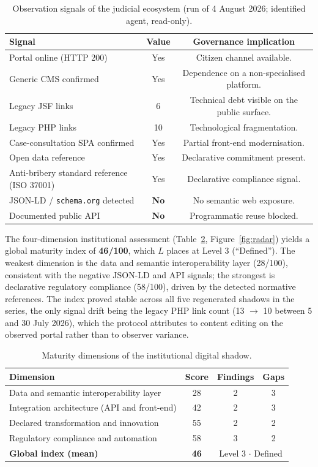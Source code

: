 \documentclass[engproc,article,submit,moreauthors]{Definitions/mdpi}
\begin{document}
\begin{table}[H]
\small
\caption{Observation signals of the judicial ecosystem (run of 4 August 2026; identified agent, read-only).\label{tab:signals}}
\begin{tabularx}{\textwidth}{Xcc}
\toprule
\textbf{Signal} & \textbf{Value} & \textbf{Governance implication}\\
\midrule
Portal online (HTTP 200) & Yes & Citizen channel available.\\
Generic CMS confirmed & Yes & Dependence on a non-specialised platform.\\
Legacy JSF links & 6 & Technical debt visible on the public surface.\\
Legacy PHP links & 10 & Technological fragmentation.\\
Case-consultation SPA confirmed & Yes & Partial front-end modernisation.\\
Open data reference & Yes & Declarative commitment present.\\
Anti-bribery standard reference (ISO 37001) & Yes & Declarative compliance signal.\\
JSON-LD / \texttt{schema.org} detected & \textbf{No} & No semantic web exposure.\\
Documented public API & \textbf{No} & Programmatic reuse blocked.\\
\bottomrule
\end{tabularx}
\end{table}

The four-dimension institutional assessment (Table~\ref{tab:cjdims}, Figure~\ref{fig:radar}) yields a global maturity index of \textbf{46/100}, which $L$ places at Level 3 (``Defined''). The weakest dimension is the data and semantic interoperability layer (28/100), consistent with the negative JSON-LD and API signals; the strongest is declarative regulatory compliance (58/100), driven by the detected normative references. The index proved stable across all five regenerated shadows in the series, the only signal drift being the legacy PHP link count (13 $\rightarrow$ 10 between 5 and 30 July 2026), which the protocol attributes to content editing on the observed portal rather than to observer variance.

\begin{table}[H]
\small
\caption{Maturity dimensions of the institutional digital shadow.\label{tab:cjdims}}
\begin{tabularx}{\textwidth}{Xccc}
\toprule
\textbf{Dimension} & \textbf{Score} & \textbf{Findings} & \textbf{Gaps}\\
\midrule
Data and semantic interoperability layer & 28 & 2 & 3\\
Integration architecture (API and front-end) & 42 & 2 & 3\\
Declared transformation and innovation & 55 & 2 & 2\\
Regulatory compliance and automation & 58 & 3 & 2\\
\midrule
\textbf{Global index (mean)} & \textbf{46} & \multicolumn{2}{c}{Level 3 $\cdot$ Defined}\\
\bottomrule
\end{tabularx}
\end{table}
\end{document}
